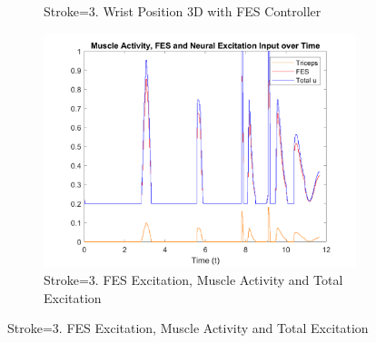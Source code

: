 \begin{landscape}
\begin{figure}[ht]
\begin{subfigure}[b]{0.33\textwidth}
            \caption{Stroke=3. Wrist Position 3D with FES Controller}
        \end{subfigure}
        \hfill
        \begin{subfigure}[b]{0.33\textwidth}
            \centering
            \includegraphics[width=\linewidth]{Pictures/Results/Controller/Stroke3/20_fes.png}
            \caption{Stroke=3. FES Excitation, Muscle Activity and Total Excitation}
        \end{subfigure}
        
        \vspace{2pt} %
    

\end{figure}
\end{landscape}
